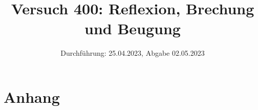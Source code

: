 

\title{Versuch 400:  Reflexion, Brechung und Beugung}
\date{Durchführung: 25.04.2023, Abgabe 02.05.2023}


\maketitle
\thispagestyle{empty} 
\tableofcontents
\newpage
\setcounter{page}{1}






\printbibliography
\newpage

\section*{Anhang}

